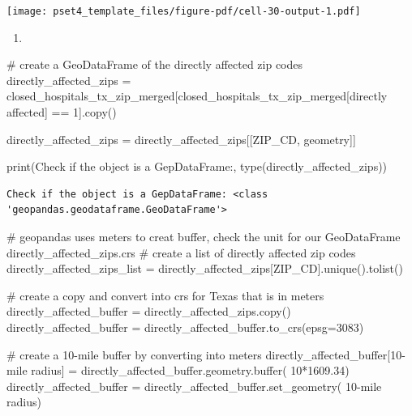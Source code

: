 \documentclass[
  letterpaper,
  DIV=11,
  numbers=noendperiod]{scrartcl}
\newenvironment{Shaded}{\begin{snugshade}}{\end{snugshade}}
\newcommand{\BuiltInTok}[1]{\textcolor[rgb]{0.00,0.23,0.31}{#1}}
\newcommand{\CommentTok}[1]{\textcolor[rgb]{0.37,0.37,0.37}{#1}}
\newcommand{\DecValTok}[1]{\textcolor[rgb]{0.68,0.00,0.00}{#1}}
\newcommand{\FloatTok}[1]{\textcolor[rgb]{0.68,0.00,0.00}{#1}}
\newcommand{\NormalTok}[1]{\textcolor[rgb]{0.00,0.23,0.31}{#1}}
\newcommand{\OperatorTok}[1]{\textcolor[rgb]{0.37,0.37,0.37}{#1}}
\newcommand{\StringTok}[1]{\textcolor[rgb]{0.13,0.47,0.30}{#1}}
\providecommand{\tightlist}{%
  \setlength{\itemsep}{0pt}\setlength{\parskip}{0pt}}\usepackage{longtable,booktabs,array}
\begin{document}
\texttt{[image: pset4\_template\_files/figure-pdf/cell-30-output-1.pdf]}

\begin{enumerate}
\def\labelenumi{\arabic{enumi}.}
\setcounter{enumi}{2}
\tightlist
\item
\end{enumerate}

\begin{Shaded}
\begin{Highlighting}[]
\CommentTok{\# create a GeoDataFrame of the directly affected zip codes}
\NormalTok{directly\_affected\_zips }\OperatorTok{=}\NormalTok{ closed\_hospitals\_tx\_zip\_merged[closed\_hospitals\_tx\_zip\_merged[}\StringTok{\textquotesingle{}directly affected\textquotesingle{}}\NormalTok{] }\OperatorTok{==} \DecValTok{1}\NormalTok{].copy()}

\NormalTok{directly\_affected\_zips }\OperatorTok{=}\NormalTok{ directly\_affected\_zips[[}\StringTok{\textquotesingle{}ZIP\_CD\textquotesingle{}}\NormalTok{, }\StringTok{\textquotesingle{}geometry\textquotesingle{}}\NormalTok{]]}

\BuiltInTok{print}\NormalTok{(}\StringTok{\textquotesingle{}Check if the object is a GepDataFrame:\textquotesingle{}}\NormalTok{, }\BuiltInTok{type}\NormalTok{(directly\_affected\_zips))}
\end{Highlighting}
\end{Shaded}

\begin{verbatim}
Check if the object is a GepDataFrame: <class 'geopandas.geodataframe.GeoDataFrame'>
\end{verbatim}

\begin{Shaded}
\begin{Highlighting}[]
\CommentTok{\# geopandas uses meters to creat buffer, check the unit for our GeoDataFrame}
\NormalTok{directly\_affected\_zips.crs}
\CommentTok{\# create a list of directly affected zip codes}
\NormalTok{directly\_affected\_zips\_list }\OperatorTok{=}\NormalTok{ directly\_affected\_zips[}\StringTok{\textquotesingle{}ZIP\_CD\textquotesingle{}}\NormalTok{].unique().tolist()}

\CommentTok{\# create a copy and convert into crs for Texas that is in meters}
\NormalTok{directly\_affected\_buffer }\OperatorTok{=}\NormalTok{ directly\_affected\_zips.copy()}
\NormalTok{directly\_affected\_buffer }\OperatorTok{=}\NormalTok{ directly\_affected\_buffer.to\_crs(epsg}\OperatorTok{=}\DecValTok{3083}\NormalTok{)}

\CommentTok{\# create a 10{-}mile buffer by converting into meters}
\NormalTok{directly\_affected\_buffer[}\StringTok{\textquotesingle{}10{-}mile radius\textquotesingle{}}\NormalTok{] }\OperatorTok{=}\NormalTok{ directly\_affected\_buffer.geometry.}\BuiltInTok{buffer}\NormalTok{(}
    \DecValTok{10}\OperatorTok{*}\FloatTok{1609.34}\NormalTok{)}
\NormalTok{directly\_affected\_buffer }\OperatorTok{=}\NormalTok{ directly\_affected\_buffer.set\_geometry(}
    \StringTok{\textquotesingle{}10{-}mile radius\textquotesingle{}}\NormalTok{)}
\end{Highlighting}
\end{Shaded}
\end{document}

